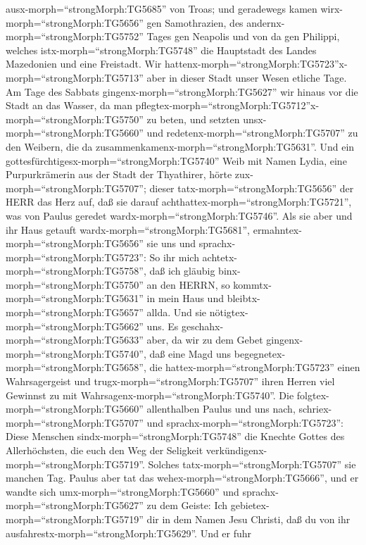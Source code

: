 ausx-morph=``strongMorph:TG5685'' von Troas; und geradewegs kamen
wirx-morph=``strongMorph:TG5656'' gen Samothrazien, des
andernx-morph=``strongMorph:TG5752'' Tages gen Neapolis 
und von da gen Philippi, welches istx-morph=``strongMorph:TG5748'' die
Hauptstadt des Landes Mazedonien und eine Freistadt. Wir
hattenx-morph=``strongMorph:TG5723''x-morph=``strongMorph:TG5713'' aber
in dieser Stadt unser Wesen etliche Tage.  Am Tage des
Sabbats gingenx-morph=``strongMorph:TG5627'' wir hinaus vor die Stadt an
das Wasser, da man
pflegtex-morph=``strongMorph:TG5712''x-morph=``strongMorph:TG5750'' zu
beten, und setzten unsx-morph=``strongMorph:TG5660'' und
redetenx-morph=``strongMorph:TG5707'' zu den Weibern, die da
zusammenkamenx-morph=``strongMorph:TG5631''.  Und ein
gottesfürchtigesx-morph=``strongMorph:TG5740'' Weib mit Namen Lydia,
eine Purpurkrämerin aus der Stadt der Thyathirer, hörte
zux-morph=``strongMorph:TG5707''; dieser
tatx-morph=``strongMorph:TG5656'' der HERR das Herz auf, daß sie darauf
achthattex-morph=``strongMorph:TG5721'', was von Paulus geredet
wardx-morph=``strongMorph:TG5746''.  Als sie aber und ihr
Haus getauft wardx-morph=``strongMorph:TG5681'',
ermahntex-morph=``strongMorph:TG5656'' sie uns und
sprachx-morph=``strongMorph:TG5723'': So ihr mich
achtetx-morph=``strongMorph:TG5758'', daß ich gläubig
binx-morph=``strongMorph:TG5750'' an den HERRN, so
kommtx-morph=``strongMorph:TG5631'' in mein Haus und
bleibtx-morph=``strongMorph:TG5657'' allda. Und sie
nötigtex-morph=``strongMorph:TG5662'' uns.  Es
geschahx-morph=``strongMorph:TG5633'' aber, da wir zu dem Gebet
gingenx-morph=``strongMorph:TG5740'', daß eine Magd uns
begegnetex-morph=``strongMorph:TG5658'', die
hattex-morph=``strongMorph:TG5723'' einen Wahrsagergeist und
trugx-morph=``strongMorph:TG5707'' ihren Herren viel Gewinnst zu mit
Wahrsagenx-morph=``strongMorph:TG5740''.  Die
folgtex-morph=``strongMorph:TG5660'' allenthalben Paulus und uns nach,
schriex-morph=``strongMorph:TG5707'' und
sprachx-morph=``strongMorph:TG5723'': Diese Menschen
sindx-morph=``strongMorph:TG5748'' die Knechte Gottes des Allerhöchsten,
die euch den Weg der Seligkeit
verkündigenx-morph=``strongMorph:TG5719''.  Solches
tatx-morph=``strongMorph:TG5707'' sie manchen Tag. Paulus aber tat das
wehex-morph=``strongMorph:TG5666'', und er wandte sich
umx-morph=``strongMorph:TG5660'' und
sprachx-morph=``strongMorph:TG5627'' zu dem Geiste: Ich
gebietex-morph=``strongMorph:TG5719'' dir in dem Namen Jesu Christi, daß
du von ihr ausfahrestx-morph=``strongMorph:TG5629''. Und er fuhr
